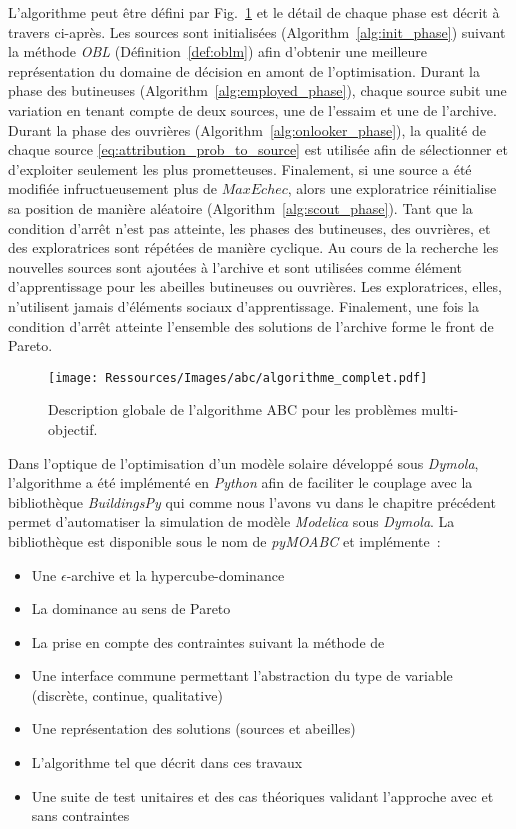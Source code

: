 L’algorithme peut être défini par Fig.~\ref{fig:abc_complet} et le détail de chaque
phase est décrit à travers ci-après.
Les sources sont initialisées (Algorithm~\ref{alg:init_phase}) suivant la méthode
\textit{OBL} (Définition~\ref{def:oblm}) afin d’obtenir une meilleure représentation du
domaine de décision en amont de l’optimisation.
Durant la phase des butineuses (Algorithm~\ref{alg:employed_phase}), chaque source
subit une variation en tenant compte de deux sources, une de l’essaim et une de l’archive.
Durant la phase des ouvrières (Algorithm~\ref{alg:onlooker_phase}), la qualité de
chaque source \eqref{eq:attribution_prob_to_source} est utilisée afin de sélectionner
et d’exploiter seulement les plus prometteuses. Finalement, si une source a été
modifiée infructueusement plus de $MaxEchec$, alors une exploratrice
réinitialise sa position de manière aléatoire  (Algorithm~\ref{alg:scout_phase}).
Tant que la condition d’arrêt n’est pas atteinte, les phases des butineuses,
des ouvrières, et des exploratrices sont répétées de manière cyclique. Au cours de
la recherche les nouvelles sources sont ajoutées à l’archive et sont utilisées
comme élément d’apprentissage pour les abeilles butineuses ou ouvrières. Les
exploratrices, elles, n’utilisent jamais d’éléments sociaux d’apprentissage.
Finalement, une fois la condition d’arrêt atteinte l’ensemble des solutions
de l’archive forme le front de Pareto.

\begin{figure}
    \begin{center}
        \texttt{[image: Ressources/Images/abc/algorithme\_complet.pdf]}
    \end{center}
    \caption{Description globale de l’algorithme ABC pour les problèmes multi-objectif.
             \label{fig:abc_complet}}
\end{figure}

Dans l’optique de l’optimisation d’un modèle solaire développé sous \textit{Dymola}, l’algorithme
a été implémenté en \textit{Python} afin de faciliter le couplage avec la bibliothèque
\textit{BuildingsPy} qui comme nous l’avons vu dans le chapitre précédent permet d’automatiser
la simulation de modèle \textit{Modelica} sous \textit{Dymola}. La bibliothèque est
disponible sous le nom de \textit{pyMOABC} et implémente~:
\begin{itemize}
  \item Une $\epsilon$-archive et la hypercube-dominance
  \item La dominance au sens de Pareto
  \item La prise en compte des contraintes suivant la méthode de \textcite{Woldesenbet20073077}
  \item Une interface commune permettant l’abstraction du type de variable (discrète, continue, qualitative)
  \item Une représentation des solutions (sources et abeilles)
  \item L’algorithme tel que décrit dans ces travaux
  \item Une suite de test unitaires et des cas théoriques validant l’approche avec
        et sans contraintes
\end{itemize}

